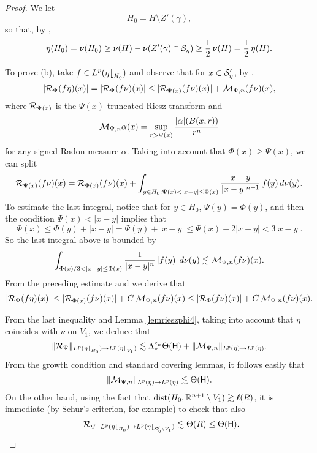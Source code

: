 \begin{proof}
We let 
$$H_0= H\setminus Z'(\gamma),$$
so that, by ,
$$\eta(H_0) = \nu(H_0) \geq \nu(H) - \nu(Z'(\gamma)\cap {\mathcal S}_\eta) \geq \frac12 \,\nu(H) = \frac12 \,\eta(H).$$

To prove (b), take $f\in L^p(\eta{\lfloor}_{H_0})$ and observe that for $x\in {\mathcal S}'_\eta$, by ,
$$|{\mathcal R}_{\Psi} (f\eta)(x)| = |{\mathcal R}_{\Psi} (f\nu)(x)|\leq |{\mathcal R}_{\Psi(x)} (f\nu)(x)| + 
{\mathcal M}_{\Psi,n}(f\nu)(x),$$
where ${\mathcal R}_{\Psi(x)}$ is the $\Psi(x)$-truncated Riesz transform and
\begin{equation}\label{eq:maximaloppsi}
{\mathcal M}_{\Psi,n} \alpha(x) = \sup_{r>\Psi(x)}\frac{|\alpha|(B(x,r))}{r^n}
\end{equation}
for any signed Radon measure $\alpha$. Taking into account that $\Phi(x)\geq\Psi(x)$, we can split
$$\RR_{\Psi(x)} (f\nu)(x) = \RR_{\Phi(x)} (f\nu)(x) + \int_{y\in H_0:\Psi(x)<|x-y|\leq \Phi(x)} 
\frac{x-y}{|x-y|^{n+1}}\,f(y)\,d\nu(y).$$
To estimate the last integral, notice that for $y\in H_0$, $\Psi(y) = \Phi(y)$, and then the condition $\Psi(x)<|x-y|$ implies that
$$\Phi(x) \leq \Phi(y) + |x-y| = \Psi(y) + |x-y| \leq \Psi(x) + 2|x-y|<3|x-y|.$$
So the last integral above is bounded by
$$\int_{\Phi(x)/3<|x-y|\leq \Phi(x)} \frac1{|x-y|^n}\,|f(y)|\,d\nu(y)\lesssim \cM_{\Psi,n}(f\nu)(x).$$
From the preceding estimate and  we derive that
$$|{\mathcal R}_{\Psi} (f\eta)(x)| \leq |{\mathcal R}_{\Phi(x)} (f\nu)(x)| + C\,{\mathcal M}_{\Psi,n}(f\nu)(x) \leq
|{\mathcal R}_{\Phi} (f\nu)(x)| + C\,{\mathcal M}_{\Psi,n}(f\nu)(x).$$

From the last inequality and Lemma \ref{lemrieszphi4}, taking into account that $\eta$ coincides with $\nu$ on $V_1$, we deduce that 
$$\|{\mathcal R}_\Psi\|_{L^p(\eta{\lfloor}_{H_0})\to L^p(\eta{\lfloor}_{V_1})}\lesssim \Lambda_*^{{\varepsilon}_n}\Theta({\mathsf{H}}) 
+ \|{\mathcal M}_{\Psi,n}\|_{L^p(\eta)\to L^p(\eta)}.$$
From the growth condition  and standard covering lemmas, it follows easily that
$$\|{\mathcal M}_{\Psi,n}\|_{L^p(\eta)\to L^p(\eta)}\lesssim\Theta({\mathsf{H}}).$$
On the other hand, using the fact that ${\rm dist}(H_0,{\mathbb R}^{n+1}\setminus V_1)\gtrsim \ell(R)$, it is immediate (by Schur's criterion, for example) to check that also
$$\|{\mathcal R}_\Psi\|_{L^p(\eta{\lfloor}_{H_0})\to L^p(\eta{\lfloor}_{{\mathcal S}_\eta'\setminus V_1})}\lesssim 
\Theta(R)\leq \Theta({\mathsf{H}}).$$
\end{proof}


\vv


